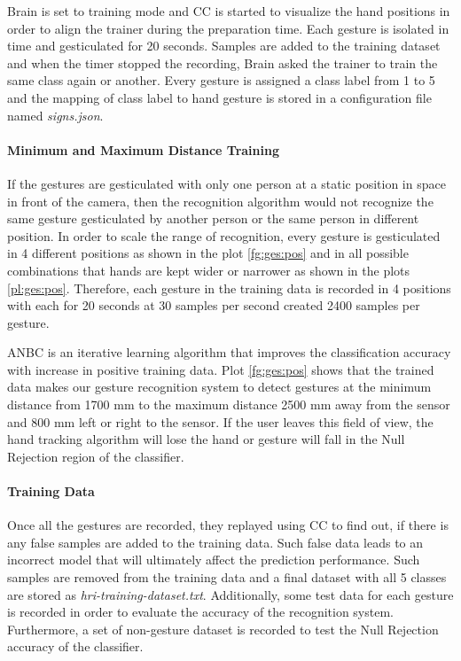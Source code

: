 

Brain is set to training mode and CC is started to visualize the hand positions in order to align the trainer during the preparation time. Each gesture is isolated in time and gesticulated for 20 seconds. Samples are added to the training dataset and when the timer stopped the recording, Brain asked the trainer to train the same class again or another. Every gesture is assigned a class label from 1 to 5 and the mapping of class label to hand gesture is stored in a configuration file named \textit{signs.json}. 



\paragraph*{Minimum and Maximum Distance Training} \label{sec:range:train} If the gestures are gesticulated with only one person at a static position in space in front of the camera, then the recognition algorithm would not recognize the same gesture gesticulated by another person or the same person in different position. In order to scale the range of recognition, every gesture is gesticulated in 4 different positions as shown in the plot \ref{fg:ges:pos} and in all possible combinations that hands are kept wider or narrower as shown in the plots \ref{pl:ges:pos}. Therefore, each gesture in the training data is recorded in 4 positions with each for 20 seconds at 30 samples per second created 2400 samples per gesture. 

ANBC is an iterative learning algorithm that improves the classification accuracy with increase in positive training data. Plot \ref{fg:ges:pos} shows that the trained data makes our gesture recognition system to detect gestures at the minimum distance from 1700 mm to the maximum distance 2500 mm away from the sensor and 800 mm left or right to the sensor. If the user leaves this field of view, the hand tracking algorithm will lose the hand or gesture will fall in the Null Rejection region of the classifier.



\paragraph*{Training Data} Once all the gestures are recorded, they replayed using CC to find out, if there is any false samples are added to the training data. Such false data leads to an incorrect model that will ultimately affect the prediction performance. Such samples are removed from the training data and a final dataset with all 5 classes are stored as \textit{hri-training-dataset.txt}. Additionally, some test data for each gesture is recorded in order to evaluate the accuracy of the recognition system. Furthermore, a set of non-gesture dataset is recorded to test the Null Rejection accuracy of the classifier. 

